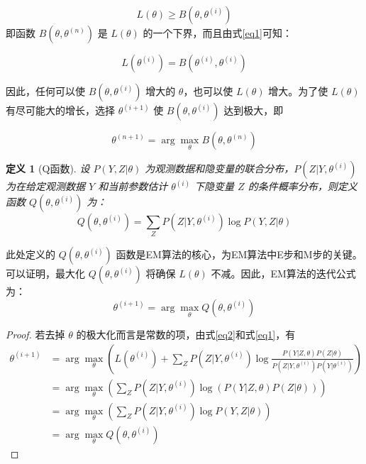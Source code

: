 \documentclass[a4paper,12pt]{ctexart} %
\newtheorem{definition}{定义}[section]
\begin{document}
\[
L(\theta) \geq B(\theta, \theta^{(i)}) 
\]
即函数 \( B(\theta, \theta^{(n)}) \) 是 \( L(\theta) \) 的一个下界，而且由式\eqref{eq1}可知：

\begin{equation}
L(\theta^{(i)}) = B(\theta^{(i)}, \theta^{(i)})
\end{equation}


因此，任何可以使 \( B(\theta, \theta^{(i)}) \) 增大的 \(\theta\)，也可以使 \( L(\theta) \) 增大。为了使 \( L(\theta) \) 有尽可能大的增长，选择 \(\theta^{(i+1)}\) 使 \( B(\theta, \theta^{(i)}) \) 达到极大，即

\begin{equation}
    \theta^{(n+1)} = \arg \max_{\theta} B(\theta, \theta^{(n)})
    \label{eq2}
\end{equation}

\begin{definition}[Q函数]

    设 \( P(Y, Z|\theta) \) 为观测数据和隐变量的联合分布，\( P(Z|Y, \theta^{(i)}) \) 为在给定观测数据 \( Y \) 和当前参数估计 \( \theta^{(i)} \) 下隐变量 \( Z \) 的条件概率分布，则定义函数 \( Q(\theta, \theta^{(i)}) \) 为：
    \begin{equation}
        Q(\theta, \theta^{(i)}) = \sum_{Z} P(Z|Y, \theta^{(i)}) \log P(Y, Z|\theta)
    \end{equation}
    
\end{definition}

此处定义的 \( Q(\theta, \theta^{(i)}) \) 函数是EM算法的核心，为EM算法中E步和M步的关键。
可以证明，最大化 \( Q(\theta, \theta^{(i)}) \) 将确保 \( L(\theta) \) 不减。因此，EM算法的迭代公式为：
\begin{equation}
\theta^{(i+1)} = \arg \max_{\theta} Q(\theta, \theta^{(i)})
\end{equation}
\begin{proof}
    若去掉 \(\theta\) 的极大化而言是常数的项，由式\eqref{eq2}和式\eqref{eq1}，有
\begin{equation}
    \begin{split}
        \theta^{(i+1)} &= \arg \max_{\theta} \left( L(\theta^{(i)}) + \sum_{Z} P(Z|Y, \theta^{(i)}) \log \frac{P(Y|Z, \theta)P(Z|\theta)}{P(Z|Y, \theta^{(i)})P(Y|\theta^{(i)})} \right) \\
        &= \arg \max_{\theta} \left( \sum_{Z} P(Z|Y, \theta^{(i)}) \log(P(Y|Z, \theta)P(Z|\theta)) \right) \\
        &= \arg \max_{\theta} \left( \sum_{Z} P(Z|Y, \theta^{(i)}) \log P(Y, Z|\theta) \right) \\
        &= \arg \max_{\theta} Q(\theta, \theta^{(i)})
    \end{split}
    \label{eq3}
\end{equation}
\end{proof}
\end{document}
